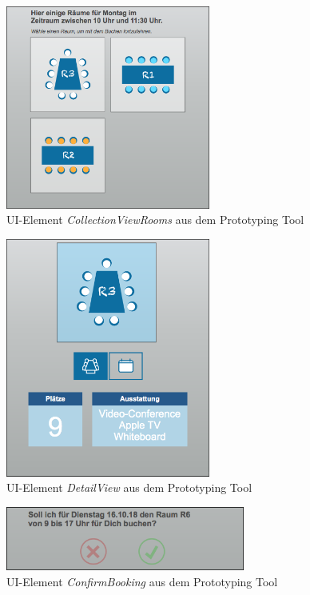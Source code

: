 \begin{figure}[!htb]
    \centering
    \includegraphics[width=0.6\textwidth]{bilder/anhang/UIElementsPrototyping/CollectionViewRooms.png}
    \caption{\acs{UI}-Element \textit{CollectionViewRooms} aus dem Prototyping Tool}
    \label{fig:ui-element-collectionviewrooms}
\end{figure}

\begin{figure}[!htb]
    \centering
    \includegraphics[width=0.6\textwidth]{bilder/anhang/UIElementsPrototyping/DetailView.png}
    \caption{\acs{UI}-Element \textit{DetailView} aus dem Prototyping Tool}
    \label{fig:ui-element-detailview}
\end{figure}

\begin{figure}[!htb]
    \centering
    \includegraphics[width=0.7\textwidth]{bilder/anhang/UIElementsPrototyping/ConfirmBookingYesNo.png}
    \caption{\acs{UI}-Element \textit{ConfirmBooking} aus dem Prototyping Tool}
    \label{fig:ui-element-confirmbooking}
\end{figure}

